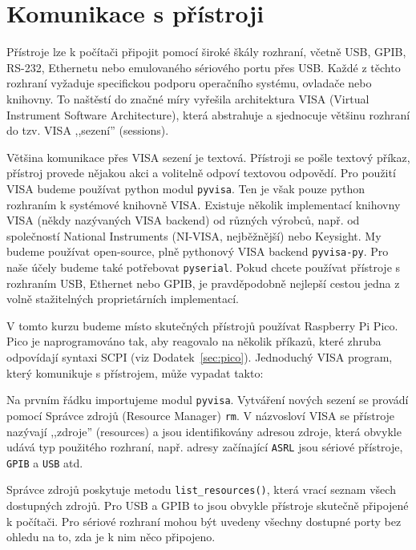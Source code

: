 \newpage
\section{Komunikace s přístroji}
Přístroje lze k počítači připojit pomocí široké škály rozhraní, včetně USB, GPIB, RS-232, Ethernetu nebo emulovaného sériového portu přes USB. Každé z těchto rozhraní vyžaduje specifickou podporu operačního systému, ovladače nebo knihovny. To naštěstí do značné míry vyřešila architektura VISA (Virtual Instrument Software Architecture), která abstrahuje a sjednocuje většinu rozhraní do tzv. VISA ,,sezení'' (sessions).

Většina komunikace přes VISA sezení je textová. Přístroji se pošle textový příkaz, přístroj provede nějakou akci a volitelně odpoví textovou odpovědí. Pro použití VISA budeme používat python modul \lstinline|pyvisa|. Ten je však pouze python rozhraním k systémové knihovně VISA. Existuje několik implementací knihovny VISA (někdy nazývaných VISA backend) od různých výrobců, např. od společností National Instruments (NI-VISA, nejběžnější) nebo Keysight. My budeme používat open-source, plně pythonový VISA backend \lstinline|pyvisa-py|. Pro naše účely budeme také potřebovat \lstinline|pyserial|. Pokud chcete používat přístroje s rozhraním USB, Ethernet nebo GPIB, je pravděpodobně nejlepší cestou jedna z volně stažitelných proprietárních implementací.

V tomto kurzu budeme místo skutečných přístrojů používat Raspberry Pi Pico. Pico je naprogramováno tak, aby reagovalo na několik příkazů, které zhruba odpovídají syntaxi SCPI (viz Dodatek~\ref{sec:pico}). Jednoduchý VISA program, který komunikuje s přístrojem, může vypadat takto:

Na prvním řádku importujeme modul \lstinline|pyvisa|. Vytváření nových sezení se provádí pomocí Správce zdrojů (Resource Manager) \lstinline|rm|. V názvosloví VISA se přístroje nazývají ,,zdroje'' (resources) a jsou identifikovány adresou zdroje, která obvykle udává typ použitého rozhraní, např. adresy začínající \lstinline|ASRL| jsou sériové přístroje, \lstinline|GPIB| a \lstinline|USB| atd.

Správce zdrojů poskytuje metodu \lstinline|list_resources()|, která vrací seznam všech dostupných zdrojů. Pro USB a GPIB to jsou obvykle přístroje skutečně připojené k počítači. Pro sériové rozhraní mohou být uvedeny všechny dostupné porty bez ohledu na to, zda je k nim něco připojeno.


